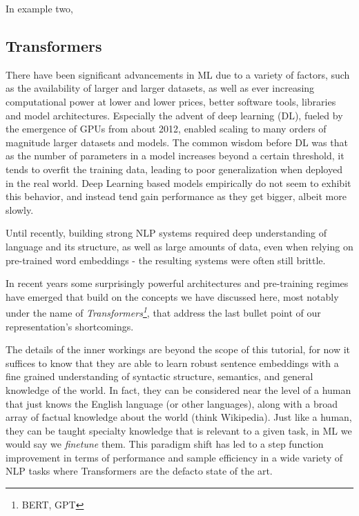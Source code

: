 In example two,


\subsection{Transformers}
There have been significant advancements in ML due to a variety of factors, such as the availability of larger and larger datasets, as well as ever increasing computational power at lower and lower prices, better software tools, libraries and model architectures.
Especially the advent of deep learning (DL), fueled by the emergence of GPUs from about 2012, enabled scaling to many orders of magnitude larger datasets and models.
The common wisdom before DL was that as the number of parameters in a model increases beyond a certain threshold, it tends to overfit the training data, leading to poor generalization when deployed in the real world.
Deep Learning based models empirically do not seem to exhibit this behavior, and instead tend gain performance as they get bigger, albeit more slowly.

Until recently, building strong NLP systems required deep understanding of language and its structure, as well as large amounts of data, even when relying on pre-trained word embeddings - the resulting systems were often still brittle.

In recent years some surprisingly powerful architectures and pre-training regimes have emerged that build on the concepts we have discussed here, most notably under the name of \textit{Transformers\footnote{BERT, GPT}}, that address the last bullet point of our representation's shortcomings.

The details of the inner workings are beyond the scope of this tutorial, for now it suffices to know that they are able to learn robust sentence embeddings with a fine grained understanding of syntactic structure, semantics, and general knowledge of the world.
In fact, they can be considered near the level of a human that just knows the English language (or other languages), along with a broad array of factual knowledge about the world (think Wikipedia).
Just like a human, they can be taught specialty knowledge that is relevant to a given task, in ML we would say we \textit{finetune} them.
This paradigm shift has led to a step function improvement in terms of performance and sample efficiency in a wide variety of NLP tasks where Transformers are the defacto state of the art.

